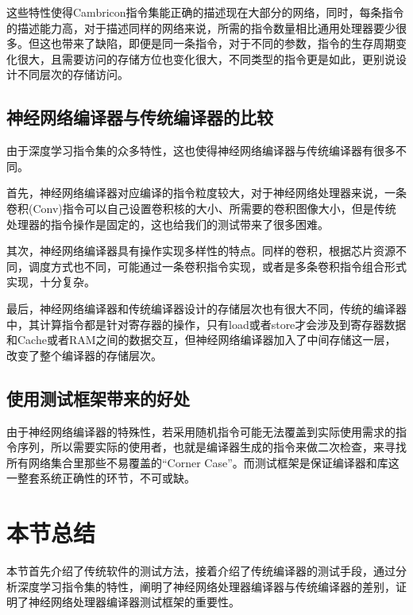 这些特性使得Cambricon指令集能正确的描述现在大部分的网络，同时，每条指令的描述能力高，对于描述同样的网络来说，所需的指令数量相比通用处理器要少很多。但这也带来了缺陷，即便是同一条指令，对于不同的参数，指令的生存周期变化很大，且需要访问的存储方位也变化很大，不同类型的指令更是如此，更别说设计不同层次的存储访问。

\subsection{神经网络编译器与传统编译器的比较}
由于深度学习指令集的众多特性，这也使得神经网络编译器与传统编译器有很多不同。

首先，神经网络编译器对应编译的指令粒度较大，对于神经网络处理器来说，一条卷积(Conv)指令可以自己设置卷积核的大小、所需要的卷积图像大小，但是传统处理器的指令操作是固定的，这也给我们的测试带来了很多困难。

其次，神经网络编译器具有操作实现多样性的特点。同样的卷积，根据芯片资源不同，调度方式也不同，可能通过一条卷积指令实现，或者是多条卷积指令组合形式实现，十分复杂。

最后，神经网络编译器和传统编译器设计的存储层次也有很大不同，传统的编译器中，其计算指令都是针对寄存器的操作，只有load或者store才会涉及到寄存器数据和Cache或者RAM之间的数据交互，但神经网络编译器加入了中间存储这一层，改变了整个编译器的存储层次。

\subsection{使用测试框架带来的好处}
由于神经网络编译器的特殊性，若采用随机指令可能无法覆盖到实际使用需求的指令序列，所以需要实际的使用者，也就是编译器生成的指令来做二次检查，来寻找所有网络集合里那些不易覆盖的“Corner Case”。而测试框架是保证编译器和库这一整套系统正确性的环节，不可或缺。

\section{本节总结}
本节首先介绍了传统软件的测试方法，接着介绍了传统编译器的测试手段，通过分析深度学习指令集的特性，阐明了神经网络处理器编译器与传统编译器的差别，证明了神经网络处理器编译器测试框架的重要性。